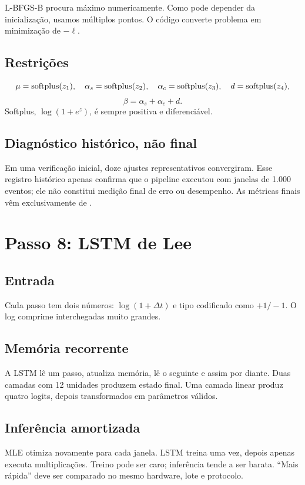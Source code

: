 \documentclass[12pt,a4paper,openany]{report}
\begin{document}
L-BFGS-B procura máximo numericamente. Como pode depender da inicialização, usamos
múltiplos pontos. O código converte problema em minimização de \(-\ell\).

\section{Restrições}

\[
\mu=\operatorname{softplus}(z_1),\quad\alpha_s=\operatorname{softplus}(z_2),\quad
\alpha_c=\operatorname{softplus}(z_3),\quad d=\operatorname{softplus}(z_4),
\]
\[
\beta=\alpha_s+\alpha_c+d.
\]
Softplus, \(\log(1+e^z)\), é sempre positiva e diferenciável.

\section{Diagnóstico histórico, não final}

Em uma verificação inicial, doze ajustes representativos convergiram. Esse registro
histórico apenas confirma que o pipeline executou com janelas de 1.000 eventos; ele
não constitui medição final de erro ou desempenho. As métricas finais vêm
exclusivamente de .

\chapter{Passo 8: LSTM de Lee}

\section{Entrada}

Cada passo tem dois números: \(\log(1+\Delta t)\) e tipo codificado como \(+1/-1\).
O log comprime interchegadas muito grandes.

\section{Memória recorrente}

A LSTM lê um passo, atualiza memória, lê o seguinte e assim por diante. Duas camadas
com 12 unidades produzem estado final. Uma camada linear produz quatro logits, depois
transformados em parâmetros válidos.

\section{Inferência amortizada}

MLE otimiza novamente para cada janela. LSTM treina uma vez, depois apenas executa
multiplicações. Treino pode ser caro; inferência tende a ser barata. ``Mais rápida''
deve ser comparado no mesmo hardware, lote e protocolo.
\end{document}
